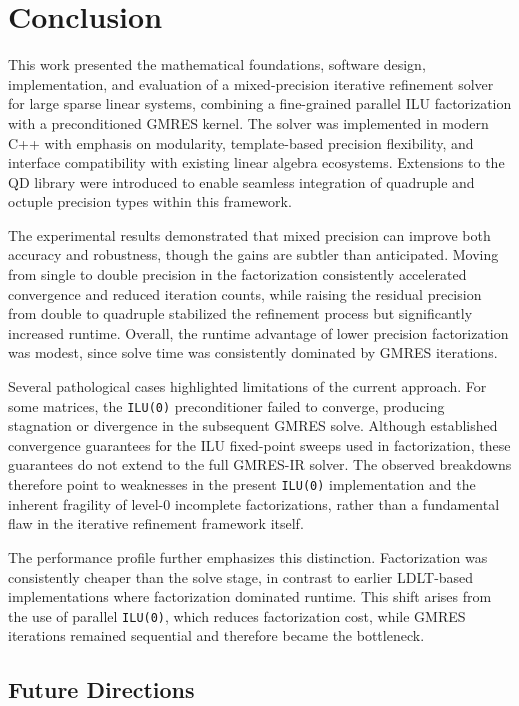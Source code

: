 \chapter{Conclusion}
\label{cha:conclusion}

This work presented the mathematical foundations, software design,
implementation, and evaluation of a mixed-precision iterative refinement solver
for large sparse linear systems, combining a fine-grained parallel ILU
factorization with a preconditioned GMRES kernel. The solver was implemented in
modern C++ with emphasis on modularity, template-based precision flexibility,
and interface compatibility with existing linear algebra ecosystems. Extensions
to the QD library were introduced to enable seamless integration of quadruple
and octuple precision types within this framework.

The experimental results demonstrated that mixed precision can improve both
accuracy and robustness, though the gains are subtler than anticipated. Moving
from single to double precision in the factorization consistently accelerated
convergence and reduced iteration counts, while raising the residual precision
from double to quadruple stabilized the refinement process but significantly
increased runtime. Overall, the runtime advantage of lower precision
factorization was modest, since solve time was consistently dominated by GMRES
iterations.

Several pathological cases highlighted limitations of the current approach. For
some matrices, the \texttt{ILU(0)} preconditioner failed to converge, producing
stagnation or divergence in the subsequent GMRES solve. Although
\textcite{chow_fine-grained_2015} established convergence guarantees for the ILU
fixed-point sweeps used in factorization, these guarantees do not extend to the
full GMRES-IR solver. The observed breakdowns therefore point to weaknesses in
the present \texttt{ILU(0)} implementation and the inherent fragility of level-0
incomplete factorizations, rather than a fundamental flaw in the iterative
refinement framework itself.

The performance profile further emphasizes this distinction. Factorization was
consistently cheaper than the solve stage, in contrast to earlier LDLT-based
implementations where factorization dominated runtime. This shift arises from
the use of parallel \texttt{ILU(0)}, which reduces factorization cost, while
GMRES iterations remained sequential and therefore became the bottleneck.

\section*{Future Directions}


